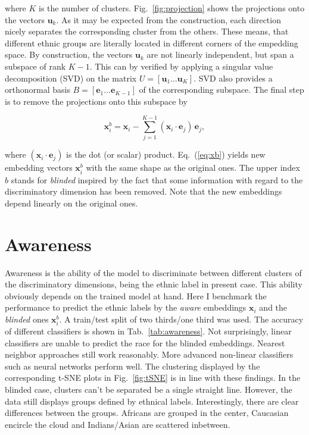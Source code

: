 \documentclass{report}
\begin{document}
\noindent where $K$ is the number of clusters. Fig.~\ref{fig:projection} shows the projections onto the vectors $\bm{u}_k$. As it may be expected from the construction, each direction nicely separates the corresponding cluster from the others. These means, that different ethnic groups are literally located in different corners of the empedding space. By construction, the vectors $\bm{u}_k$ are not linearly independent, but span a subspace of rank $K-1$. This can by verified by applying a singular value decomposition (SVD) on the matrix $U=[\bm{u}_1\ldots \bm{u}_K]$. SVD also provides a orthonormal basis $B=[\bm{e}_1\ldots \bm{e}_{K-1}]$ of the corresponding subspace. The final step is to remove the projections onto this subspace by

\begin{equation}
\label{eq:xb}
	\bm{x}_i^{b} = \bm{x}_i - \sum_{j=1}^{K-1} (\bm{x}_i\cdot \bm{e}_j)\,\bm{e}_j,
\end{equation} 

\noindent where $(\bm{x}_i\cdot \bm{e}_j)$ is the dot (or scalar) product.  Eq.~(\ref{eq:xb}) yields new embedding vectors $\bm{x}_i^{b}$ with the same shape as the original ones. The upper index $b$ stands for \emph{blinded} inspired by the fact that some information with regard to the discriminatory dimension has been removed. Note that the new embeddings depend linearly on the original ones. 
   

\section{Awareness}

Awareness is the ability of the model to discriminate between different clusters of the discriminatory dimensions, being the ethnic label in present case. This ability obviously depends on the trained model at hand. Here I benchmark the performance to predict the ethnic labels by the \emph{aware} embeddings $\bm{x}_i$ and the \emph{blinded} ones $\bm{x}_i^{b}$.  A train/test split of two thirds/one third was used. The accuracy of different classifiers is shown in Tab.~\ref{tab:awareness}. Not surprisingly, linear classifiers are unable to predict the race for the blinded embeddings. Nearest neighbor approaches still work reasonably. More advanced non-linear classifiers such as neural networks perform well. The clustering displayed by the corresponding t-SNE plots in Fig.~\ref{fig:tSNE} is in line with these findings. In the blinded case, clusters can't be separated be a single straight line. However, the data still displays groups defined by ethnical labels. Interestingly, there are clear differences between the groups. Africans are grouped in the center, Caucasian encircle the cloud and Indians/Asian are scattered inbetween. 
\end{document}
